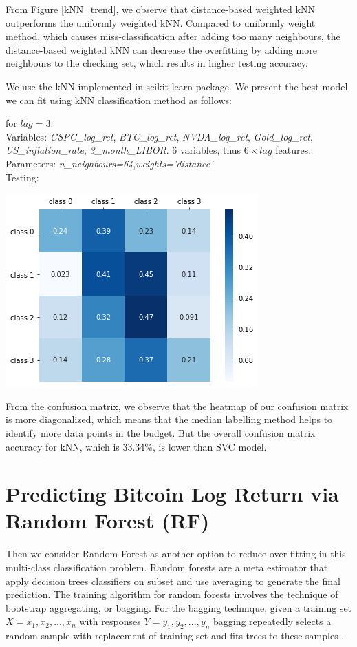 \documentclass[9pt,twocolumn,twoside]{ilcss}
\begin{document}
From Figure \ref{kNN_trend}, we observe that distance-based weighted kNN outperforms the uniformly weighted kNN.  Compared to uniformly weight method, which causes miss-classification after adding too many neighbours, the distance-based weighted kNN can decrease the overfitting by adding more neighbours to the checking set, which results in higher testing accuracy. 

We use the kNN implemented in scikit-learn package. We present the best model we can fit using kNN classification method as follows:

\noindent  for $lag = 3$:
\smallskip\\
Variables: \textit{GSPC\_log\_ret}, \textit{BTC\_log\_ret}, \textit{NVDA\_log\_ret}, \textit{Gold\_log\_ret}, \textit{US\_inflation\_rate}, \textit{3\_month\_LIBOR}. 6 variables, thus $6\times lag$ features.\\
Parameters: \textit{n\_neighbours=64},\textit{weights='distance'}
\smallskip\\
Testing:

\begin{center}
\includegraphics[scale=0.35]{kNN_test.png}
\end{center}

From the confusion matrix, we observe that the heatmap of our confusion matrix is more diagonalized, which means that the median labelling method helps to identify more data points in the budget. But the overall confusion matrix accuracy for kNN, which is 33.34\%, is lower than SVC model.

\section{Predicting Bitcoin Log Return via Random Forest (RF)}

Then we consider Random Forest as another option to reduce over-fitting in this multi-class classification problem. Random forests are a meta estimator that apply decision trees classifiers on subset and use averaging to generate the final prediction. The training algorithm for random forests involves the technique of bootstrap aggregating, or bagging.
For the bagging technique, given a training set $X = x_1,x_2,...,x_n$ with responses $Y = y_1,y_2,...,y_n$ bagging repeatedly selects a random sample with replacement of training set and fits trees to these samples \cite{lin2006random}.
\end{document}
